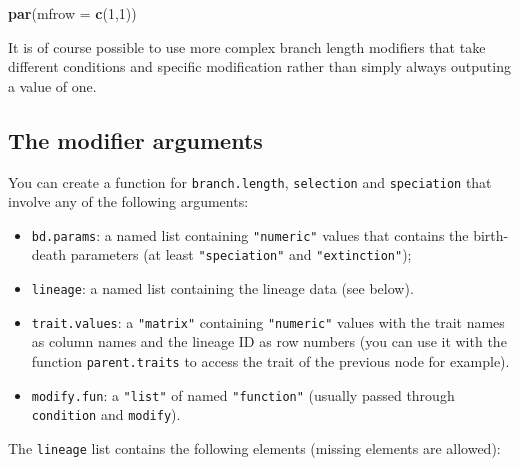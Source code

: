 \documentclass[
]{book}
\newenvironment{Shaded}{\begin{snugshade}}{\end{snugshade}}
\newcommand{\DataTypeTok}[1]{\textcolor[rgb]{0.13,0.29,0.53}{#1}}
\newcommand{\DecValTok}[1]{\textcolor[rgb]{0.00,0.00,0.81}{#1}}
\newcommand{\KeywordTok}[1]{\textcolor[rgb]{0.13,0.29,0.53}{\textbf{#1}}}
\newcommand{\NormalTok}[1]{#1}
\providecommand{\tightlist}{%
  \setlength{\itemsep}{0pt}\setlength{\parskip}{0pt}}
\begin{document}
\begin{Shaded}
\begin{Highlighting}[]
\KeywordTok{par}\NormalTok{(}\DataTypeTok{mfrow =} \KeywordTok{c}\NormalTok{(}\DecValTok{1}\NormalTok{,}\DecValTok{1}\NormalTok{))}
\end{Highlighting}
\end{Shaded}

It is of course possible to use more complex branch length modifiers that take different conditions and specific modification rather than simply always outputing a value of one.

\hypertarget{allowarguments}{%
\subsection{The modifier arguments}\label{allowarguments}}

You can create a function for \texttt{branch.length}, \texttt{selection} and \texttt{speciation} that involve any of the following arguments:

\begin{itemize}
\tightlist
\item
  \texttt{bd.params}: a named list containing \texttt{"numeric"} values that contains the birth-death parameters (at least \texttt{"speciation"} and \texttt{"extinction"});
\item
  \texttt{lineage}: a named list containing the lineage data (see below).
\item
  \texttt{trait.values}: a \texttt{"matrix"} containing \texttt{"numeric"} values with the trait names as column names and the lineage ID as row numbers (you can use it with the function \texttt{parent.traits} to access the trait of the previous node for example).
\item
  \texttt{modify.fun}: a \texttt{"list"} of named \texttt{"function"} (usually passed through \texttt{condition} and \texttt{modify}).
\end{itemize}

The \texttt{lineage} list contains the following elements (missing elements are allowed):
\end{document}

